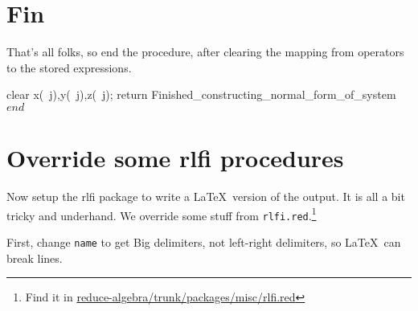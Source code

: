 \documentclass[11pt,a5paper]{article}
\begin{document}
\section{Fin}
That's all folks, so end the procedure, after clearing the
mapping from operators to the stored expressions. 
\begin{reduce}
clear x(~j),y(~j),z(~j);
return Finished_constructing_normal_form_of_system$ 
end$
\end{reduce}





\section{Override some rlfi procedures}

Now setup the rlfi package to write a \LaTeX\ version of the
output. It is all a bit tricky and underhand. We override
some stuff from \verb|rlfi.red|.\footnote{Find it in
\url{reduce-algebra/trunk/packages/misc/rlfi.red}}  

First, change \verb|name| to get Big delimiters, not
left-right delimiters, so \LaTeX\ can break lines.
\end{document}
